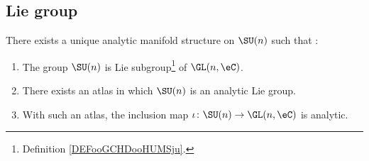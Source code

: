 \subsection{Lie group}

\begin{proposition}        \label{PROPooPXRJooLNnMFn}
	There exists a unique analytic manifold structure on \( \SU(n)\) such that :
	\begin{enumerate}
		\item       \label{ITEMooHZQRooFGCVjP}
		      The group \( \SU(n)\) is Lie subgroup\footnote{Definition \ref{DEFooGCHDooHUMSju}.} of \( \GL(n,\eC)\).
		\item		\label{ITEMooQLGKooHDIzPS}
		      There exists an atlas in which \( \SU(n)\) is an analytic Lie group.
		\item	\label{ITEMooXZPDooCNfNji}
		      With such an atlas, the inclusion map \( \iota\colon \SU(n)\to \GL(n,\eC)\) is analytic.
	\end{enumerate}
\end{proposition}

